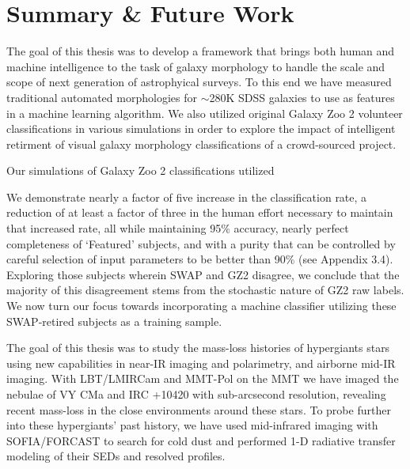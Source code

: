 \chapter{Summary \& Future Work}
\label{chap:summary}

The goal of this thesis was to develop a framework that brings both human and machine intelligence to the task of galaxy morphology to handle the scale and scope of next generation of astrophyical surveys. To this end we have measured traditional automated morphologies for $\sim$280K SDSS galaxies to use as features in a machine learning algorithm. We also utilized original Galaxy Zoo 2 volunteer classifications in various simulations in order to explore the impact of intelligent retirment of visual galaxy morphology classifications of a crowd-sourced project.  

Our simulations of Galaxy Zoo 2 classifications utilized 





We demonstrate nearly a factor of five increase in the classification rate, a reduction of
at least a factor of three in the human effort necessary to maintain that increased rate,
all while maintaining 95\% accuracy, nearly perfect completeness of ‘Featured’ subjects,
and with a purity that can be controlled by careful selection of input parameters to be
better than 90\% (see Appendix 3.4). Exploring those subjects wherein SWAP and GZ2
disagree, we conclude that the majority of this disagreement stems from the stochastic
nature of GZ2 raw labels. We now turn our focus towards incorporating a machine
classifier utilizing these SWAP-retired subjects as a training sample.

The goal of this thesis was to study the mass-loss histories of hypergiants stars using new capabilities in near-IR imaging and polarimetry, and airborne mid-IR imaging.  With LBT/LMIRCam and MMT-Pol on the MMT we have imaged the nebulae of VY CMa and IRC +10420 with sub-arcsecond resolution, revealing recent mass-loss in the close environments around these stars.  To probe further into these hypergiants' past history, we have used mid-infrared imaging with SOFIA/FORCAST to search for cold dust and performed 1-D radiative transfer modeling of their SEDs and resolved profiles.


